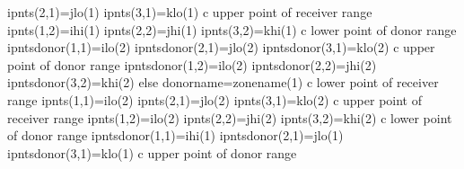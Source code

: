 \documentclass[12pt]{article}
\begin{document}
{\newline\indent\indent\indent      ipnts(2,1)=jlo(1)
\newline\indent\indent\indent      ipnts(3,1)=klo(1)
\newline c   upper point of receiver range
\newline\indent\indent\indent      ipnts(1,2)=ihi(1)
\newline\indent\indent\indent      ipnts(2,2)=jhi(1)
\newline\indent\indent\indent      ipnts(3,2)=khi(1)
\newline c   lower point of donor range
\newline\indent\indent\indent      ipntsdonor(1,1)=ilo(2)
\newline\indent\indent\indent      ipntsdonor(2,1)=jlo(2)
\newline\indent\indent\indent      ipntsdonor(3,1)=klo(2)
\newline c   upper point of donor range
\newline\indent\indent\indent      ipntsdonor(1,2)=ilo(2)
\newline\indent\indent\indent      ipntsdonor(2,2)=jhi(2)
\newline\indent\indent\indent      ipntsdonor(3,2)=khi(2)
\newline\indent\indent   else
\newline\indent\indent\indent      donorname=zonename(1)
\newline c   lower point of receiver range
\newline\indent\indent\indent      ipnts(1,1)=ilo(2)
\newline\indent\indent\indent      ipnts(2,1)=jlo(2)
\newline\indent\indent\indent      ipnts(3,1)=klo(2)
\newline c   upper point of receiver range
\newline\indent\indent\indent      ipnts(1,2)=ilo(2)
\newline\indent\indent\indent      ipnts(2,2)=jhi(2)
\newline\indent\indent\indent      ipnts(3,2)=khi(2)
\newline c   lower point of donor range
\newline\indent\indent\indent      ipntsdonor(1,1)=ihi(1)
\newline\indent\indent\indent      ipntsdonor(2,1)=jlo(1)
\newline\indent\indent\indent      ipntsdonor(3,1)=klo(1)
\newline c   upper point of donor range
}
\end{document}
